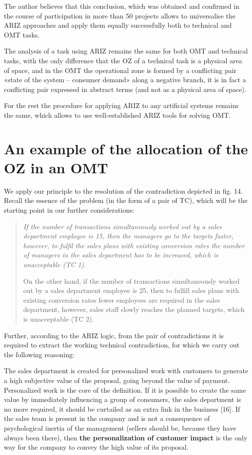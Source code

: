 \documentclass[11pt,a4paper]{book}
\begin{document}
The author believes that this conclusion, which was obtained and confirmed in
the course of participation in more than 50 projects allows to universalise
the ARIZ approaches and apply them equally successfully both to technical and
OMT tasks.

The analysis of a task using ARIZ remains the same for both OMT and technical
tasks, with the only difference that the OZ of a technical task is a physical
area of space, and in the OMT the operational zone is formed by a conflicting
pair «state of the system -- consumer demand» along a negative branch, it is
in fact a conflicting pair expressed in abstract terms (and not as a physical
area of space).

For the rest the procedure for applying ARIZ to any artificial systems remains
the same, which allows to use well-established ARIZ tools for solving OMT.

\section{An example of the allocation of the OZ in an OMT}

We apply our principle to the resolution of the contradiction depicted in
fig. 14.  Recall the essence of the problem (in the form of a pair of TC),
which will be the starting point in our further considerations:

\begin{quote}\it
  If the number of transactions simultaneously worked out by a sales
  department employee is 15, then the managers go to the targets faster,
  however, to fulfil the sales plans with existing conversion rates the number
  of managers in the sales department has to be increased, which is
  unacceptable (TC 1).

  On the other hand, if the number of transactions simultaneously worked out
  by a sales department employee is 25, then to fulfill sales plans with
  existing conversion rates fewer employees are required in the sales
  department, however, sales staff slowly reaches the planned targets, which
  is unacceptable (TC 2).
\end{quote}
Further, according to the ARIZ logic, from the pair of contradictions it is
required to extract the working technical contradiction, for which we carry
out the following reasoning:

The sales department is created for personalized work with customers to
generate a high subjective value of the proposal, going beyond the value of
payment. Personalized work is the core of the definition. If it is possible to
create the same value by immediately influencing a group of consumers, the
sales department is no more required, it should be curtailed as an extra link
in the business [16]. If the sales team is present in the company and is not a
consequence of psychological inertia of the management (sellers should be,
because they have always been there), then \textbf{the personalization of
  customer impact} is the only way for the company to convey the high value of
its proposal.
\end{document}
